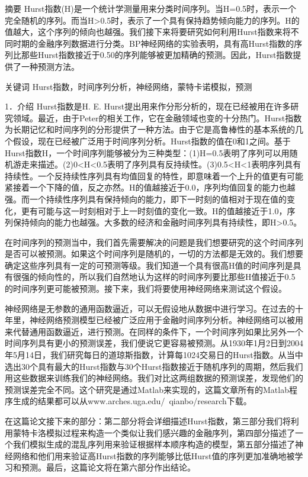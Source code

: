 \documentclass[12pt]{article}
\begin{document}
摘要
Hurst指数(H)是一个统计学测量用来分类时间序列。当H=0.5时，表示一个完全随机的序列。而当H>0.5时，表示了一个具有保持趋势倾向能力的序列。H的值越大，这个序列的倾向也越强。我们接下来将要研究如何利用Hurst指数来将不同时期的金融序列数据进行分类。BP神经网络的实验表明，具有高Hurst指数的序列比那些Hurst指数接近于0.50的序列能够被更加精确的预测。因此，Hurst指数提供了一种预测方法。

关键词
Hurst指数，时间序列分析，神经网络，蒙特卡诺模拟，预测


1．介绍
Hurst指数是H. E. Hurst提出用来作分形分析的，现在已经被用在许多研究领域。最近，由于Peter的相关工作，它在金融领域也变的十分热门。Hurst指数为长期记忆和时间序列的分形提供了一种方法。由于它是高鲁棒性的基本系统的几个假设，现在已经被广泛用于时间序列分析。Hurst指数的值在0和1之间。基于Hurst指数H，一个时间序列能够被分为三种类型：(1)H=0.5表明了序列可以用随机游走来描述。(2)0<H<0.5表明了序列具有反持续性。(3)0.5<H<1表明序列具有持续性。一个反持续性序列具有均值回复的特性，即意味着一个上升的值更有可能紧接着一个下降的值，反之亦然。H的值越接近于0.0，序列均值回复的能力也越强。而一个持续性序列具有保持倾向的能力，即下一时刻的值相对于现在值的变化，更有可能与这一时刻相对于上一时刻值的变化一致。H的值越接近于1.0，序列保持倾向的能力也越强。大多数的经济和金融时间序列具有持续性，即H>0.5。

在时间序列的预测当中，我们首先需要解决的问题是我们想要研究的这个时间序列是否可以被预测。如果这个时间序列是随机的，一切的方法都是无效的。我们想要确定这些序列具有一定的可预测等级。我们知道一个具有很高H值的时间序列是具有很强的倾向性的，所以我们自然地认为这样的时间序列要比那些H值接近于0.5的时间序列更可能被预测。接下来，我们将要使用神经网络来测试这个假设。

神经网络是无参数的通用函数逼近，可以无假设地从数据中进行学习。在过去的十年里，神经网络预测模型已经被广泛应用于金融时间序列分析。神经网络可以被用来代替通用函数逼近，进行预测。在同样的条件下，一个时间序列如果比另外一个时间序列具有更小的预测误差，我们便说它更容易被预测。从1930年1月2日到2004年5月14日，我们研究每日的道琼斯指数，计算每1024交易日的Hurst指数。从当中选出30个具有最大的Hurst指数与30个Hurst指数接近于随机序列的周期，然后我们用这些数据来训练我们的神经网络。我们对比这两组数据的预测误差，发现他们的预测误差完全不同。这个研究是通过Matlab来实现的，这篇文章所有的Matlab程序生成的结果都可以从www.arches.uga.edu/~qianbo/research下载。

在这篇论文接下来的部分：第二部分将会详细描述Hurst指数，第三部分我们将利用蒙特卡洛模拟过程来构造一个类似让我们感兴趣的金融序列，第四部分描述了一个我们模拟生成的混乱序列用来验证根据样本顺序构造的模型，第五部分描述了神经网络和他们用来验证高Hurst指数的序列能够比低Hurst值的序列更加准确地被学习和预测。最后，这篇论文将在第六部分作出结论。
\end{document}

